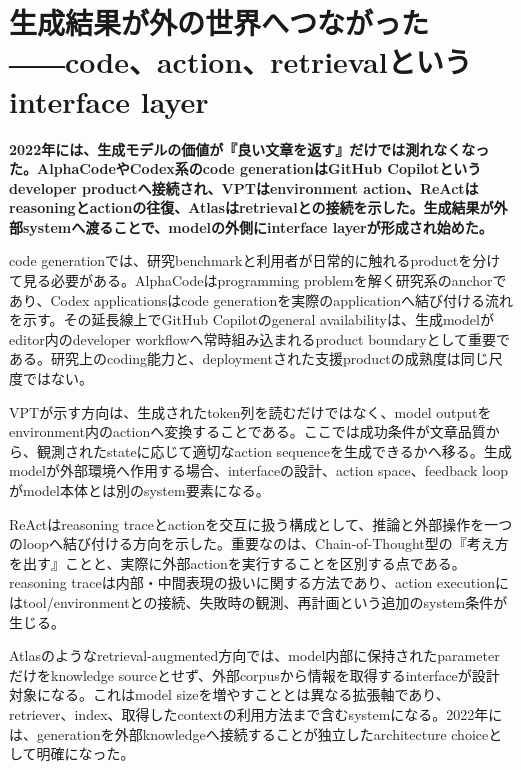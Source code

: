\section{生成結果が外の世界へつながった――code、action、retrievalというinterface layer}
\label{pkg:code-action-retrieval}
\noindent\textbf{2022年には、生成モデルの価値が『良い文章を返す』だけでは測れなくなった。AlphaCodeやCodex系のcode generationはGitHub Copilotというdeveloper productへ接続され、VPTはenvironment action、ReActはreasoningとactionの往復、Atlasはretrievalとの接続を示した。生成結果が外部systemへ渡ることで、modelの外側にinterface layerが形成され始めた。}\autocite{src-4e33c3e8216e,src-811e1008822e,src-8170b5e4c279,src-b1418e7ae779,src-d117f3860a91,src-dc0d76e03fc6}

code generationでは、研究benchmarkと利用者が日常的に触れるproductを分けて見る必要がある。AlphaCodeはprogramming problemを解く研究系のanchorであり、Codex applicationsはcode generationを実際のapplicationへ結び付ける流れを示す。その延長線上でGitHub Copilotのgeneral availabilityは、生成modelがeditor内のdeveloper workflowへ常時組み込まれるproduct boundaryとして重要である。研究上のcoding能力と、deploymentされた支援productの成熟度は同じ尺度ではない。\autocite{src-21b0842f98ec,src-8170b5e4c279,src-b1418e7ae779,src-dc0d76e03fc6}


VPTが示す方向は、生成されたtoken列を読むだけではなく、model outputをenvironment内のactionへ変換することである。ここでは成功条件が文章品質から、観測されたstateに応じて適切なaction sequenceを生成できるかへ移る。生成modelが外部環境へ作用する場合、interfaceの設計、action space、feedback loopがmodel本体とは別のsystem要素になる。\autocite{src-4e33c3e8216e,src-d117f3860a91}


ReActはreasoning traceとactionを交互に扱う構成として、推論と外部操作を一つのloopへ結び付ける方向を示した。重要なのは、Chain-of-Thought型の『考え方を出す』ことと、実際に外部actionを実行することを区別する点である。reasoning traceは内部・中間表現の扱いに関する方法であり、action executionにはtool/environmentとの接続、失敗時の観測、再計画という追加のsystem条件が生じる。\autocite{src-811e1008822e}


Atlasのようなretrieval-augmented方向では、model内部に保持されたparameterだけをknowledge sourceとせず、外部corpusから情報を取得するinterfaceが設計対象になる。これはmodel sizeを増やすこととは異なる拡張軸であり、retriever、index、取得したcontextの利用方法まで含むsystemになる。2022年には、generationを外部knowledgeへ接続することが独立したarchitecture choiceとして明確になった。\autocite{src-039e57a4916e}



